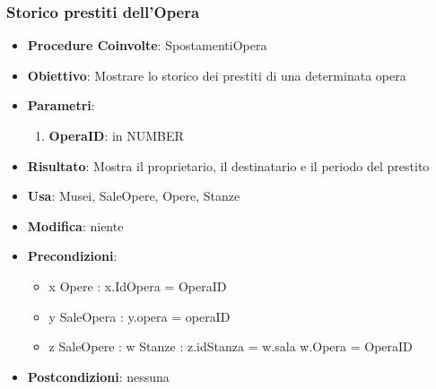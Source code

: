 \subsubsection{Storico prestiti dell’Opera}
\begin{itemize}
    \item \textbf{Procedure Coinvolte}: SpostamentiOpera
    \item \textbf{Obiettivo}: Mostrare lo storico dei prestiti di una determinata opera
    \item \textbf{Parametri}:
	\begin{enumerate}
		\item \textbf{OperaID}: in NUMBER
	\end{enumerate}
	\item \textbf{Risultato}: Mostra il proprietario, il destinatario e il periodo del prestito
	\item \textbf{Usa}: Musei, SaleOpere, Opere, Stanze
	\item \textbf{Modifica}: niente
	\item \textbf{Precondizioni}:
	\begin{itemize}
		\item \exists x \in Opere : x.IdOpera = OperaID\\
		\item \exists y \in SaleOpera : y.opera = operaID
		\item \exists z \in SaleOpere : \exists w \in Stanze : z.idStanza = w.sala \land w.Opera = OperaID\\
	\end{itemize}
	\item \textbf{Postcondizioni}: nessuna
\end{itemize}


